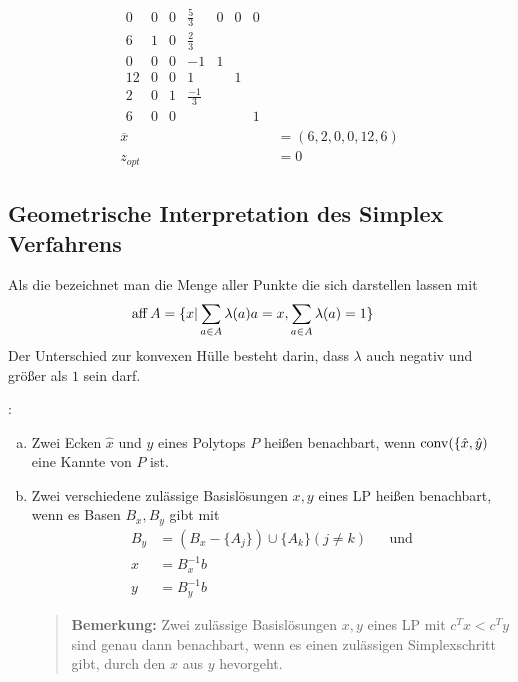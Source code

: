 \begin{example}
\begin{align*}
\begin{matrix}
0	& 0 & 0 & \tfrac{5}{3} & 0 & 0 & 0\\
6 	& 1 & 0 & \tfrac{2}{3} & & & \\
0	& 0 & 0 & -1 & 1 & & \\
12	& 0 & 0 & 1 & & 1 & \\
2	& 0 & 1 & \tfrac{-1}{3} & & & \\
6	& 0 & 0 & & & & 1
\end{matrix}\\
\overline{x} &= (6,2,0,0,12,6) \\
z_{opt} &= 0
\end{align*}
\end{example}

\subsection{Geometrische Interpretation des Simplex Verfahrens}
\begin{definition}
Als die  bezeichnet man die Menge aller Punkte die sich darstellen lassen mit 
\begin{align*}
\operatorname{aff} A &= \{ x | \sum_{a \in A} \lambda(a) a = x, \sum_{a \in A} \lambda(a) = 1\}
\end{align*}
Der Unterschied zur konvexen Hülle besteht darin, dass $\lambda$ auch negativ und größer als $1$ sein darf.
\end{definition}
\begin{definition} :
\begin{enumerate}[(a)]
\item Zwei Ecken $\hat{x}$ und $\hat{y}$ eines Polytops $P$ heißen benachbart, wenn $\operatorname{conv}(\{\hat{x},\hat{y})$ eine Kannte von $P$ ist.
\item Zwei verschiedene zulässige Basislösungen $x,y$ eines LP heißen benachbart, wenn es Basen $B_x, B_y$ gibt mit
\begin{align*}
B_y &= ( B_x - \{ A_j \} ) \cup \{ A_k \} ( j \neq k ) && \text{und} \\
x &= B^{-1}_x b \\
y &= B^{-1}_y b
\end{align*}
\begin{quote}
\textbf{Bemerkung:} Zwei zulässige Basislösungen $x,y$ eines LP mit $c^Tx < c^Ty$ sind genau dann benachbart, wenn es einen zulässigen Simplexschritt gibt, durch den $x$ aus $y$ hevorgeht.
\end{quote}
\end{enumerate}
\end{definition}
